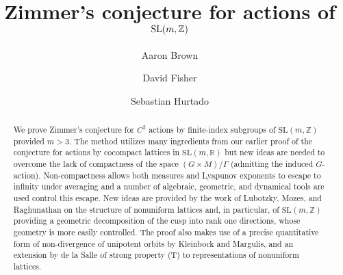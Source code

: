 \documentclass[10pt,reqno]{amsart}
\title{Zimmer's conjecture for actions of $\Sl(m,\Z)$}
\author[A.~Brown]{Aaron Brown}
\author[D.~Fisher]{David Fisher}
\author[S.~Hurtado]{Sebastian Hurtado}
\theoremstyle{Theorem}
\theoremstyle{definition}
\theoremstyle{remark}
\newcommand{\R}{\mathbb {R}}
\newcommand{\Z}{\mathbb {Z}}
\newcommand{\Sl}{\mathrm{SL}}
\begin{document}
\maketitle

\begin{abstract}
We prove Zimmer's conjecture for $C^2$ actions by finite-index subgroups of $\Sl(m,\Z)$ provided $m>3$. The method utilizes many ingredients from our earlier proof of the conjecture for actions by cocompact lattices in $\Sl(m,\R)$  \cite{BFH} but new ideas are needed to overcome the lack of compactness
of the  space $(G \times M)/\Gamma$ (admitting the induced $G$-action).  Non-compactness allows both measures and Lyapunov exponents to escape to infinity under averaging and
a  number of algebraic, geometric, and dynamical tools are used control this escape.
 New ideas are provided by the
work of Lubotzky, Mozes, and Raghunathan on the structure of nonuniform lattices and, in particular, of $\Sl(m,\Z)$ providing a   geometric decomposition of the cusp into rank one directions, whose  geometry is more easily controlled. The proof also makes use of a precise quantitative form of non-divergence of unipotent orbits by Kleinbock and Margulis, and an extension by de la Salle of strong property (T) to representations of nonuniform lattices.
\end{abstract}










\end{document}
